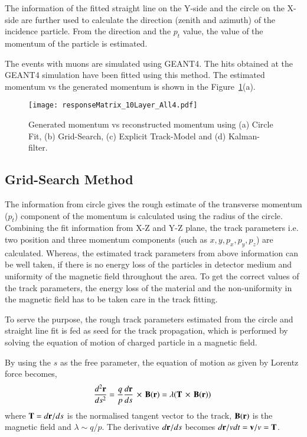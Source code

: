The information of the fitted straight line on the Y-side and the circle
on the X-side are further used to calculate the direction (zenith and
azimuth) of the incidence particle. From the direction and the $p_t$
value, the value of the momentum of the particle is estimated.

The events with muons are simulated using GEANT4. The hits obtained
at the GEANT4 simulation have been fitted using this method.
The estimated momentum vs the generated momentum is shown in the
Figure~\ref{fig:recomom}(a).
\begin{figure}[h]
  \centering
  \texttt{[image: responseMatrix\_10Layer\_All4.pdf]}
  \caption{Generated momentum vs reconstructed momentum using
    (a) Circle Fit, (b) Grid-Search, (c) Explicit Track-Model
    and (d) Kalman-filter.}
  \label{fig:recomom}
\end{figure}


\subsection{Grid-Search Method}
The information from circle gives the rough estimate of the transverse
momentum ($p_{t}$) component of the momentum is calculated using the
radius of the circle. Combining the fit information from X-Z and Y-Z
plane, the track parameters i.e. two position and three momentum
components (such as $x,y,p_{x},p_{y},p_{z}$) are calculated. Whereas, the estimated
track parameters from above information can be well taken, if there
is no energy loss of the particles in detector medium and uniformity
of the magnetic field throughout the area. To get the correct values of
the track parameters, the energy loss of the material and the
non-uniformity in the magnetic field has to be taken care in the track
fitting.

To serve the purpose, the rough track parameters estimated from the
circle and straight line fit is fed as seed for the track
propagation, which is performed by solving the equation of motion of
charged particle in a magnetic field.

By using the $s$ as the free parameter, the equation of motion as given
by Lorentz force becomes,
\begin{equation}
  \frac{d^{2}{\bf r}}{ds^{2}}=\frac{q}{p}\frac{d{\bf r}}{ds}\,\times\,{\bf B(r)} = \lambda({\bf T}\,\times\,{\bf B(r)})~
  \label{eqn:lorentzeqn}
\end{equation}
where ${\bf T} = d{\bf r}/ds$ is the normalised tangent vector to the
track, ${\bf B(r)}$ is the magnetic field and $\lambda\sim q/p$. The
derivative $d{\bf r}/ds$ becomes $d{\bf r}/vdt = {\bf v}/v = {\bf T}$.

